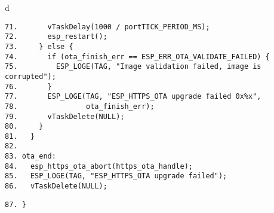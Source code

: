 \documentclass[a4paper,12pt]{book}
\begin{document}
\begin{codebloc}
\begin{tabular}{d}
\vspace{2pt}
\begin{verbatim}
71.       vTaskDelay(1000 / portTICK_PERIOD_MS);
72.       esp_restart();
73.     } else {
74.       if (ota_finish_err == ESP_ERR_OTA_VALIDATE_FAILED) {
75.         ESP_LOGE(TAG, "Image validation failed, image is corrupted");
76.       }
77.       ESP_LOGE(TAG, "ESP_HTTPS_OTA upgrade failed 0x%x",
78.                ota_finish_err);
79.       vTaskDelete(NULL);
80.     }
81.   }
82.
83. ota_end:
84.   esp_https_ota_abort(https_ota_handle);
85.   ESP_LOGE(TAG, "ESP_HTTPS_OTA upgrade failed");
86.   vTaskDelete(NULL);
\end{verbatim}
\verb|87. }|
\end{tabular}
\end{codebloc}
\end{document}
